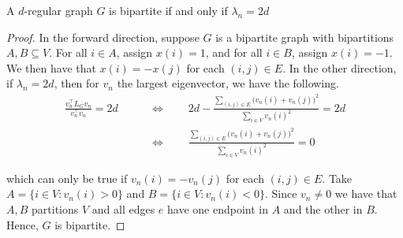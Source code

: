 \begin{theorem}
A $d$-regular graph $G$ is bipartite if and only if $\lambda_n = 2d$
\end{theorem}
\begin{proof}
In the forward direction, suppose $G$ is a bipartite graph with bipartitions $A, B \subseteq V$. For all $i \in A$, assign $x(i) = 1$, and for all $i \in B$, assign $x(i) = -1$. We then have that $x(i) = -x(j)$ for each $(i, j) \in E$. In the other direction, if $\lambda_n = 2d$, then for $v_n$ the largest eigenvector, we have the following.
\begin{align*}
\frac{v_n^\top L_G v_n}{v_n^\top v_n} = 2d
&\qquad\Longleftrightarrow\qquad
2d - \frac{\sum_{(i, j) \in E} \big( v_n(i) + v_n(j) \big)^2 }{\sum_{i \in V} v_n(i)^2} = 2d \\
&\qquad\Longleftrightarrow\qquad
\frac{\sum_{(i, j) \in E} \big( v_n(i) + v_n(j) \big)^2 }{\sum_{i \in V} v_n(i)^2} = 0
\end{align*}

which can only be true if $v_n(i) = -v_n(j)$ for each $(i, j) \in E$. Take $A = \{ i \in V : v_n(i) > 0 \}$ and $B = \{ i \in V : v_n(i) < 0 \}$. Since $v_n \neq 0$ we have that $A, B$ partitions $V$ and all edges $e$ have one endpoint in $A$ and the other in $B$. Hence, $G$ is bipartite.
\end{proof}
